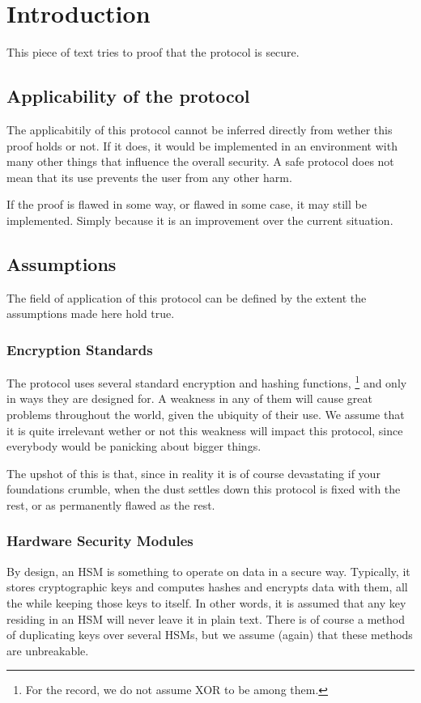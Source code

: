 \section{Introduction}
This piece of text tries to proof that the \TIMO protocol is secure.
\subsection{Applicability of the protocol}
The applicabitily of this protocol cannot be inferred directly from wether this proof holds or not.
If it does,
it would be implemented in an environment with many other things that influence the overall security.
A safe protocol does not mean that its use prevents the user from any other harm.
\par
If the proof is flawed in some way,
or flawed in some case,
it may still be implemented.
Simply because it is an improvement over the current situation.
\subsection{Assumptions}
The field of application of this protocol can be defined by the extent the assumptions made here hold true.
\subsubsection{Encryption Standards}
The \TIMO protocol uses several standard encryption and hashing functions,%
\footnote{For the record,
we do not assume XOR to be among them.}
and only in ways they are designed for.
A weakness in any of them will cause great problems throughout the world,
given the ubiquity of their use.
We assume that it is quite irrelevant wether or not this weakness will impact this protocol,
since everybody would be panicking about bigger things.
\par
The upshot of this is that,
since in reality it is of course devastating if your foundations crumble,
when the dust settles down this protocol is fixed with the rest,
or as permanently flawed as the rest.
\subsubsection{Hardware Security Modules}
By design,
an HSM is something to operate on data in a secure way.
Typically,
it stores cryptographic keys and computes hashes and encrypts data with them,
all the while keeping those keys to itself.
In other words,
it is assumed that any key residing in an HSM will never leave it in plain text.
There is of course a method of duplicating keys over several HSMs,
but we assume
(again)
that these methods are unbreakable.
